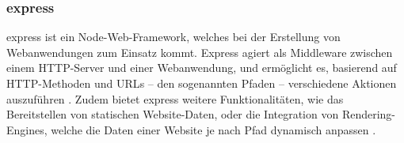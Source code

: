 \subsubsection{express}
\glqq{}express\grqq{} ist ein Node-Web-Framework, welches bei der Erstellung von Webanwendungen zum Einsatz kommt. Express agiert als Middleware zwischen einem \acs{HTTP}-Server und einer Webanwendung, und ermöglicht es, basierend auf \acs{HTTP}-Methoden und \acs{URL}s -- den sogenannten \glqq{}Pfaden\grqq{} -- verschiedene Aktionen auszuführen \cite{express}. Zudem bietet express weitere Funktionalitäten, wie das Bereitstellen von statischen Website-Daten, oder die Integration von \glqq{}Rendering-Engines\grqq{}, welche die Daten einer Website je nach Pfad dynamisch anpassen \cite{express}.